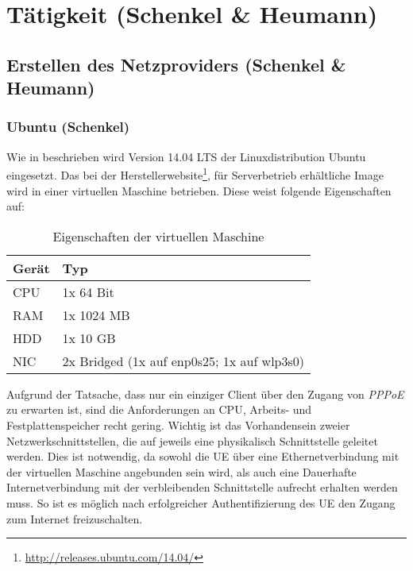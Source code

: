 \section{Tätigkeit (Schenkel \& Heumann)}

\subsection{Erstellen des Netzproviders (Schenkel \& Heumann)}

	\subsubsection{Ubuntu (Schenkel)}
	Wie in  beschrieben wird Version 14.04 LTS
	der Linuxdistribution Ubuntu eingesetzt. Das bei der Herstellerwebsite\footnote{\url{http://releases.ubuntu.com/14.04/}},
	für Serverbetrieb erhältliche Image wird in einer virtuellen Maschine betrieben.
	Diese weist folgende Eigenschaften auf:

	\begin{table}[h]
	\begin{tabularx}{\textwidth}{|l|X|}
    	\hline
      		\textbf{Gerät} & \textbf{Typ} \\
    	\hline
    	\hline
    		CPU & 1x 64 Bit \\
    	\hline
    	\hline
    		RAM & 1x 1024 MB \\
    	\hline
    	\hline
    		HDD & 1x 10 GB \\
    	\hline
    	\hline
    		NIC & 2x Bridged (1x auf enp0s25; 1x auf wlp3s0) \\
    	\hline
    	\end{tabularx}
       	\caption{Eigenschaften der virtuellen Maschine}
       	\end{table}

    	Aufgrund der Tatsache, dass nur ein einziger Client über den Zugang von \textit{PPPoE}
    	zu erwarten ist, sind die Anforderungen an CPU, Arbeits- und Festplattenspeicher
    	recht gering. Wichtig ist das Vorhandensein zweier Netzwerkschnittstellen, die
    	auf jeweils eine physikalisch Schnittstelle geleitet werden. Dies ist notwendig,
    	da sowohl die UE über eine Ethernetverbindung mit der virtuellen Maschine angebunden sein wird,
    	als auch eine Dauerhafte Internetverbindung mit der verbleibenden Schnittstelle
    	aufrecht erhalten werden muss. So ist es möglich nach erfolgreicher Authentifizierung
    	des UE den Zugang zum Internet freizuschalten.

